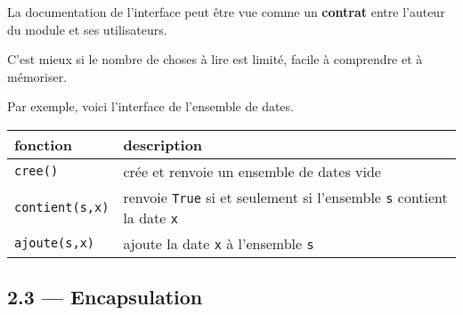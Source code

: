 \documentclass[a4paper,17pt]{extarticle}
\begin{document}
\begin{remarque}
    La documentation de l'interface peut être vue comme un \textbf{contrat}
entre l'auteur du module et ses utilisateurs.

C'est mieux si le nombre de choses à lire est limité, facile à
comprendre et à mémoriser.

        \end{remarque}\begin{exemple}
    Par exemple, voici l'interface de l'ensemble de dates.

\begin{longtable}[]{@{}ll@{}}
\toprule
\begin{minipage}[b]{0.47\columnwidth}\raggedright
fonction\strut
\end{minipage} & \begin{minipage}[b]{0.47\columnwidth}\raggedright
description\strut
\end{minipage}\tabularnewline
\midrule
\endhead
\begin{minipage}[t]{0.47\columnwidth}\raggedright
\texttt{cree()}\strut
\end{minipage} & \begin{minipage}[t]{0.47\columnwidth}\raggedright
crée et renvoie un ensemble de dates vide\strut
\end{minipage}\tabularnewline
\begin{minipage}[t]{0.47\columnwidth}\raggedright
\texttt{contient(s,x)}\strut
\end{minipage} & \begin{minipage}[t]{0.47\columnwidth}\raggedright
renvoie \texttt{True} si et seulement si l'ensemble \texttt{s} contient
la date \texttt{x}\strut
\end{minipage}\tabularnewline
\begin{minipage}[t]{0.47\columnwidth}\raggedright
\texttt{ajoute(s,x)}\strut
\end{minipage} & \begin{minipage}[t]{0.47\columnwidth}\raggedright
ajoute la date \texttt{x} à l'ensemble \texttt{s}\strut
\end{minipage}\tabularnewline
\bottomrule
\end{longtable}

        \end{exemple}
    \hypertarget{encapsulation}{%
\subsection{2.3 --- Encapsulation}\label{encapsulation}}
\end{document}
